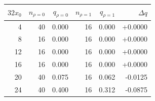 \begin{tabular}{rrrrrr}
\toprule
$32x_0$ & $n_{\rho=0}$ & $q_{\rho=0}$ & $n_{\rho=1}$ & $q_{\rho=1}$ & $\Delta q$ \\
\midrule
4 & 40 & 0.000 & 16 & 0.000 & +0.0000 \\
8 & 16 & 0.000 & 16 & 0.000 & +0.0000 \\
12 & 16 & 0.000 & 16 & 0.000 & +0.0000 \\
16 & 16 & 0.000 & 16 & 0.000 & +0.0000 \\
20 & 40 & 0.075 & 16 & 0.062 & -0.0125 \\
24 & 40 & 0.400 & 16 & 0.312 & -0.0875 \\
\bottomrule
\end{tabular}